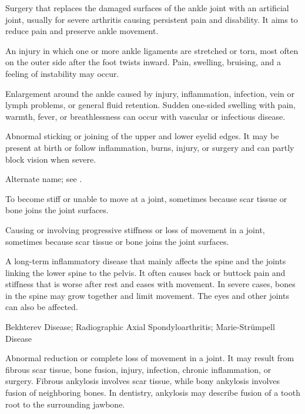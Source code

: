  Surgery that replaces the damaged surfaces of the ankle joint with an artificial joint, usually for severe arthritis causing persistent pain and disability. It aims to reduce pain and preserve ankle movement.

 An injury in which one or more ankle ligaments are stretched or torn, most often on the outer side after the foot twists inward. Pain, swelling, bruising, and a feeling of instability may occur.

 Enlargement around the ankle caused by injury, inflammation, infection, vein or lymph problems, or general fluid retention. Sudden one-sided swelling with pain, warmth, fever, or breathlessness can occur with vascular or infectious disease.

 Abnormal sticking or joining of the upper and lower eyelid edges. It may be present at birth or follow inflammation, burns, injury, or surgery and can partly block vision when severe.

 Alternate name; see .

 To become stiff or unable to move at a joint, sometimes because scar tissue or bone joins the joint surfaces.

 Causing or involving progressive stiffness or loss of movement in a joint, sometimes because scar tissue or bone joins the joint surfaces.

 A long-term inflammatory disease that mainly affects the spine and the joints linking the lower spine to the pelvis. It often causes back or buttock pain and stiffness that is worse after rest and eases with movement. In severe cases, bones in the spine may grow together and limit movement. The eyes and other joints can also be affected.

\synonyms
Bekhterev Disease; Radiographic Axial Spondyloarthritis; Marie-Strümpell Disease

 Abnormal reduction or complete loss of movement in a joint. It may result from fibrous scar tissue, bone fusion, injury, infection, chronic inflammation, or surgery. Fibrous ankylosis involves scar tissue, while bony ankylosis involves fusion of neighboring bones. In dentistry, ankylosis may describe fusion of a tooth root to the surrounding jawbone.

